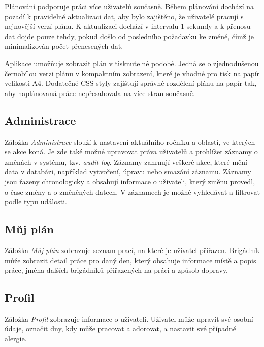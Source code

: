 Plánování podporuje práci více uživatelů současně. Během plánování dochází na pozadí k pravidelné aktualizaci dat, aby bylo zajištěno,
že uživatelé pracují s nejnovější verzí plánu. K aktualizaci dochází v intervalu 1 sekundy a k přenosu dat dojde pouze tehdy, pokud došlo od posledního požadavku ke změně,
čímž je minimalizován počet přenesených dat.

Aplikace umožňuje zobrazit plán v tisknutelné podobě. Jedná se o zjednodušenou černobílou verzi plánu v kompaktním zobrazení, které je vhodné pro tisk na 
papír velikosti A4. Dodatečné CSS styly zajišťují správné rozdělení plánu na papír tak, aby naplánovaná práce nepřesahovala na více stran současně.

\subsection{Administrace}

Záložka \textit{Administrace} slouží k nastavení aktuálního ročníku a oblastí, ve kterých se akce koná. Je zde také možné upravovat
práva uživatelů a prohlížet záznamy o změnách v systému, tzv. \textit{audit log}. Záznamy zahrnují veškeré akce, které mění data v databázi,
například vytvoření, úpravu nebo smazání záznamu. Záznamy jsou řazeny chronologicky a obsahují informace o uživateli, který změnu provedl,
o čase změny a o změněných datech. V záznamech je možné vyhledávat a filtrovat podle typu události.

\subsection{Můj plán}

Záložka \textit{Můj plán} zobrazuje seznam prací, na které je uživatel přiřazen. Brigádník může zobrazit detail práce pro daný den,
který obsahuje informace místě a popis práce, jména dalších brigádníků přiřazených na práci a způsob dopravy.

\subsection{Profil}

Záložka \textit{Profil} zobrazuje informace o uživateli. Uživatel může upravit své osobní údaje, označit dny, kdy může pracovat a adorovat,
a nastavit své případné alergie.
